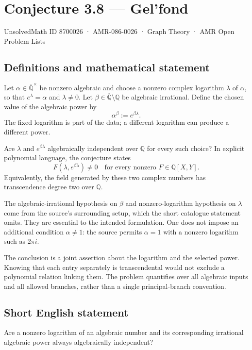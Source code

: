 \documentclass[11pt,a4paper]{article}
\begin{document}
\section*{Conjecture 3.8 — Gel’fond}\label{8700026}
{\small UnsolvedMath ID 8700026 · AMR-086-0026 · Graph Theory · AMR Open Problem Lists}
\subsection{Definitions and mathematical statement}
Let $\alpha\in\overline{\mathbb Q}^{\times}$ be nonzero algebraic and choose a nonzero complex logarithm $\lambda$ of $\alpha$, so that $e^\lambda=\alpha$ and $\lambda\ne0$. Let $\beta\in\overline{\mathbb Q}\setminus\mathbb Q$ be algebraic irrational. Define the chosen value of the algebraic power by
\[
\alpha^\beta:=e^{\beta\lambda}.
\]
The fixed logarithm is part of the data; a different logarithm can produce a different power.

Are $\lambda$ and $e^{\beta\lambda}$ algebraically independent over $\mathbb Q$ for every such choice? In explicit polynomial language, the conjecture states
\[
F(\lambda,e^{\beta\lambda})\ne0
\quad\text{for every nonzero }F\in\mathbb Q[X,Y].
\]
Equivalently, the field generated by these two complex numbers has transcendence degree two over $\mathbb Q$.

The algebraic-irrational hypothesis on $\beta$ and nonzero-logarithm hypothesis on $\lambda$ come from the source's surrounding setup, which the short catalogue statement omits. They are essential to the intended formulation. One does not impose an additional condition $\alpha\ne1$: the source permits $\alpha=1$ with a nonzero logarithm such as $2\pi i$.

The conclusion is a joint assertion about the logarithm and the selected power. Knowing that each entry separately is transcendental would not exclude a polynomial relation linking them. The problem quantifies over all algebraic inputs and all allowed branches, rather than a single principal-branch convention.
\subsection{Short English statement}
Are a nonzero logarithm of an algebraic number and its corresponding irrational algebraic power always algebraically independent?
\end{document}
